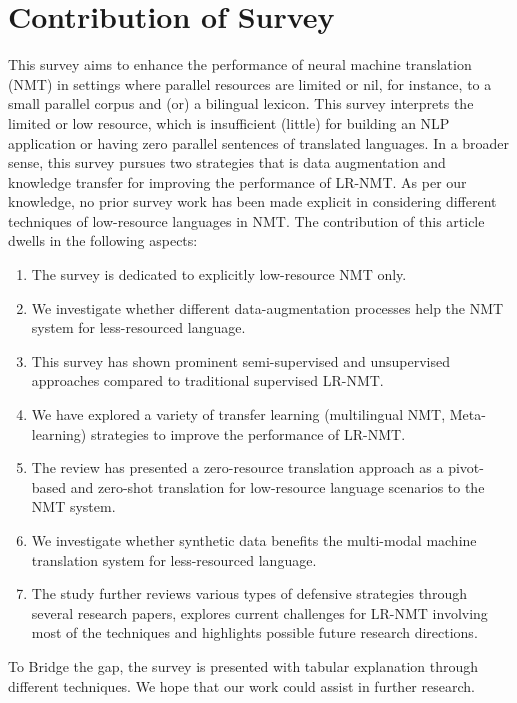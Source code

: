 \documentclass[manuscript,screen]{acmart}
\begin{document}
\section{Contribution of Survey}
\label{contribute}
This survey aims to enhance the performance of neural machine translation (NMT) in settings where parallel resources are limited or nil, for instance, to a small parallel corpus and (or) a bilingual lexicon. This survey interprets the limited or low resource, which is insufficient (little) for building an NLP application or having zero parallel sentences of translated languages. In a broader sense, this survey pursues two strategies that is data augmentation and knowledge transfer for improving the performance of LR-NMT. As per our knowledge, no prior survey work has been made explicit in considering different techniques of low-resource languages in NMT. The contribution of this article dwells in the following aspects:
\begin{enumerate}
    \item The survey is dedicated to explicitly low-resource NMT only.
    \item We investigate whether different data-augmentation processes help the NMT system for less-resourced language.
    \item This survey has shown prominent semi-supervised and unsupervised approaches compared to traditional supervised LR-NMT.
    \item We have explored a variety of transfer learning (multilingual NMT, Meta-learning) strategies to improve the performance of LR-NMT. 
    \item The review has presented a zero-resource translation approach as a pivot-based and zero-shot translation for low-resource language scenarios to the NMT system.
    \item We investigate whether synthetic data benefits the multi-modal machine translation system for less-resourced language.
    \item The study further reviews various types of defensive strategies through several research papers, explores current challenges for LR-NMT involving most of the techniques and highlights possible future research directions.
\end{enumerate}

To Bridge the gap, the survey is presented with tabular explanation through different techniques. We hope that our work could assist in further research.
\end{document}
